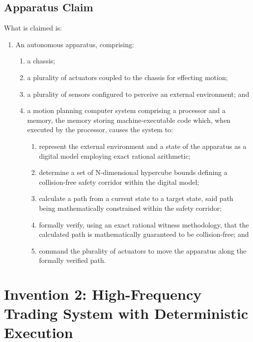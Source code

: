 \documentclass{article}
\begin{document}
\subsection{Apparatus Claim}
\noindent What is claimed is:
\begin{enumerate}
    \item An autonomous apparatus, comprising:
    \begin{enumerate}
        \item[(a)] a chassis;
        \item[(b)] a plurality of actuators coupled to the chassis for effecting motion;
        \item[(c)] a plurality of sensors configured to perceive an external environment; and
        \item[(d)] a motion planning computer system comprising a processor and a memory, the memory storing machine-executable code which, when executed by the processor, causes the system to:
        \begin{enumerate}
            \item[(i)] represent the external environment and a state of the apparatus as a digital model employing exact rational arithmetic;
            \item[(ii)] determine a set of N-dimensional hypercube bounds defining a collision-free safety corridor within the digital model;
            \item[(iii)] calculate a path from a current state to a target state, said path being mathematically constrained within the safety corridor;
            \item[(iv)] formally verify, using an exact rational witness methodology, that the calculated path is mathematically guaranteed to be collision-free; and
            \item[(v)] command the plurality of actuators to move the apparatus along the formally verified path.
        \end{enumerate}
    \end{enumerate}
\end{enumerate}

\pagebreak

\section{Invention 2: High-Frequency Trading System with Deterministic Execution}
\end{document}
